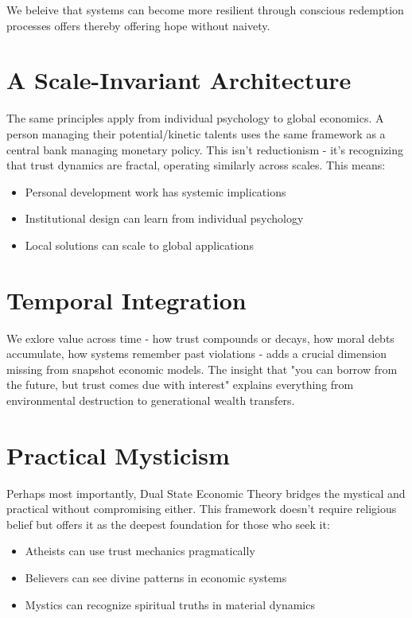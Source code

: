 \documentclass[11pt,oneside]{book}
\begin{document}
We beleive that systems can become more resilient through conscious redemption processes offers thereby offering hope without naivety.

\section*{A Scale-Invariant Architecture}

The same principles apply from individual psychology to global economics. A person managing their potential/kinetic talents uses the same framework as a central bank managing monetary policy. This isn't reductionism - it's recognizing that trust dynamics are fractal, operating similarly across scales. This means:

\begin{itemize}
\item Personal development work has systemic implications
\item Institutional design can learn from individual psychology
\item Local solutions can scale to global applications
\end{itemize}

\section*{Temporal Integration}

We exlore value across time - how trust compounds or decays, how moral debts accumulate, how systems remember past violations - adds a crucial dimension missing from snapshot economic models. The insight that "you can borrow from the future, but trust comes due with interest" explains everything from environmental destruction to generational wealth transfers.

\section*{Practical Mysticism}

Perhaps most importantly, Dual State Economic Theory bridges the mystical and practical without compromising either. This framework doesn't require religious belief but offers it as the deepest foundation for those who seek it:

\begin{itemize}
\item Atheists can use trust mechanics pragmatically
\item Believers can see divine patterns in economic systems
\item Mystics can recognize spiritual truths in material dynamics
\end{itemize}
\end{document}
